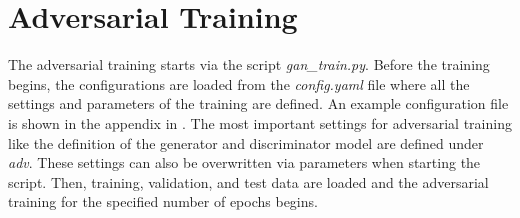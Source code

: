 \section{Adversarial Training}
\label{sec:adv_training}
%
The adversarial training starts via the script \textit{gan\_train.py}.
Before the training begins, the configurations are loaded from the \textit{config.yaml} file where all the settings and parameters of the training are defined.
An example configuration file is shown in the appendix in .
The most important settings for adversarial training like the definition of the generator and discriminator model are defined under \textit{adv}.
These settings can also be overwritten via parameters when starting the script.
Then, training, validation, and test data are loaded and the adversarial training for the specified number of epochs begins.

